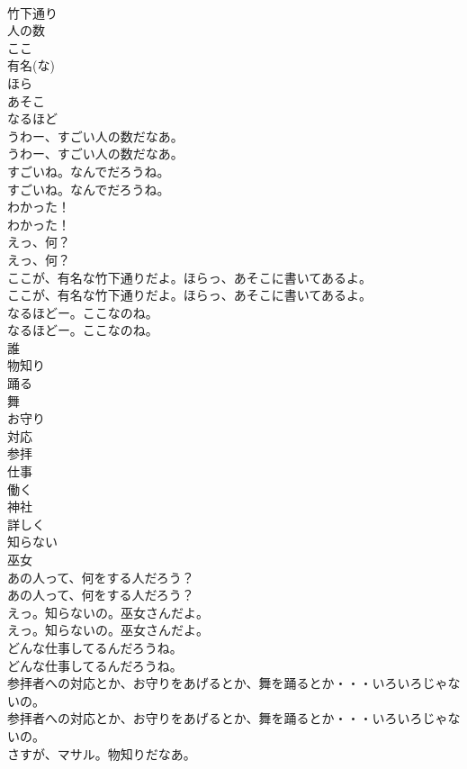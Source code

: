\documentclass[8pt]{extreport}
\begin{document}
\begin{CJK}{UTF8}{min}
\\	竹下通り
\\	人の数
\\	ここ
\\	有名(な)
\\	ほら
\\	あそこ
\\	なるほど
\\	うわー、すごい人の数だなあ。	
\\	うわー、すごい人の数だなあ。 
\\	すごいね。なんでだろうね。	
\\	すごいね。なんでだろうね。 
\\	わかった！	
\\	わかった！ 
\\	えっ、何？	
\\	えっ、何？ 
\\	ここが、有名な竹下通りだよ。ほらっ、あそこに書いてあるよ。	
\\	ここが、有名な竹下通りだよ。ほらっ、あそこに書いてあるよ。 
\\	なるほどー。ここなのね。	
\\	なるほどー。ここなのね。 
\\	誰
\\	物知り
\\	踊る
\\	舞
\\	お守り
\\	対応
\\	参拝
\\	仕事
\\	働く
\\	神社
\\	詳しく
\\	知らない
\\	巫女
\\	あの人って、何をする人だろう？	
\\	あの人って、何をする人だろう？ 
\\	えっ。知らないの。巫女さんだよ。	
\\	えっ。知らないの。巫女さんだよ。 
\\	どんな仕事してるんだろうね。	
\\	どんな仕事してるんだろうね。 
\\	参拝者への対応とか、お守りをあげるとか、舞を踊るとか・・・いろいろじゃないの。	
\\	参拝者への対応とか、お守りをあげるとか、舞を踊るとか・・・いろいろじゃないの。 
\\	さすが、マサル。物知りだなあ。	

\end{CJK}
\end{document}
